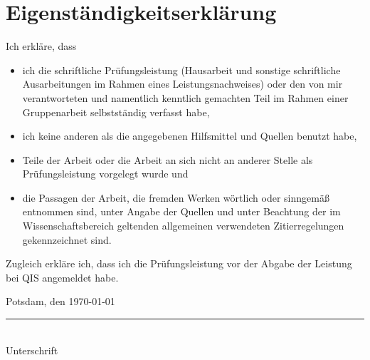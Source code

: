 \documentclass[
    a4paper,
    12pt,
    headinclude=true,
    BCOR=10mm,
]{scrreprt}
\begin{document}
\newpage
{}
\chapter*{Eigenständigkeitserklärung}
Ich erkläre, dass
\begin{itemize}
    \item ich die schriftliche Prüfungsleistung (Hausarbeit und sonstige schriftliche Ausarbeitungen im Rahmen eines Leistungsnachweises) oder den von mir verantworteten und namentlich kenntlich gemachten Teil im Rahmen einer Gruppenarbeit selbstständig verfasst habe,
    \item ich keine anderen als die angegebenen Hilfsmittel und Quellen benutzt habe,
    \item Teile der Arbeit oder die Arbeit an sich nicht an anderer Stelle als Prüfungsleistung vorgelegt wurde und
    \item die Passagen der Arbeit, die fremden Werken wörtlich oder sinngemäß entnommen sind, unter Angabe der Quellen und unter Beachtung der im Wissenschaftsbereich geltenden allgemeinen verwendeten Zitierregelungen gekennzeichnet sind.
\end{itemize}

Zugleich erkläre ich, dass ich die Prüfungsleistung vor der Abgabe der Leistung bei QIS angemeldet habe.

\vspace{2cm}

\noindent
Potsdam, den \today

\vspace{2cm}

\noindent
\rule{6cm}{0.4pt}\\
Unterschrift

\printbibliography
\newpage
\appendix
\end{document}
